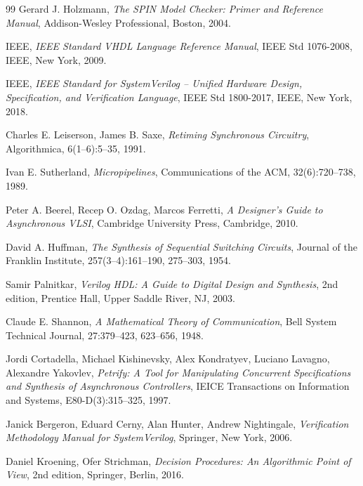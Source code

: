 ﻿\documentclass[a4paper,12pt]{article}
\theoremstyle{definition}
\begin{document}
\begin{thebibliography}{99}
		Gerard J. Holzmann,
		\textit{The SPIN Model Checker: Primer and Reference Manual},
		Addison-Wesley Professional, Boston, 2004.

		IEEE,
		\textit{IEEE Standard VHDL Language Reference Manual},
		IEEE Std 1076-2008, IEEE, New York, 2009.

		IEEE,
		\textit{IEEE Standard for SystemVerilog -- Unified Hardware Design, Specification,
		and Verification Language},
		IEEE Std 1800-2017, IEEE, New York, 2018.

		Charles E. Leiserson, James B. Saxe,
		\textit{Retiming Synchronous Circuitry},
		Algorithmica, 6(1--6):5--35, 1991.

		Ivan E. Sutherland,
		\textit{Micropipelines},
		Communications of the ACM, 32(6):720--738, 1989.

		Peter A. Beerel, Recep O. Ozdag, Marcos Ferretti,
		\textit{A Designer's Guide to Asynchronous VLSI},
		Cambridge University Press, Cambridge, 2010.

		David A. Huffman,
		\textit{The Synthesis of Sequential Switching Circuits},
		Journal of the Franklin Institute, 257(3--4):161--190, 275--303, 1954.

		Samir Palnitkar,
		\textit{Verilog HDL: A Guide to Digital Design and Synthesis},
		2nd edition, Prentice Hall, Upper Saddle River, NJ, 2003.

		Claude E. Shannon,
		\textit{A Mathematical Theory of Communication},
		Bell System Technical Journal, 27:379--423, 623--656, 1948.

		Jordi Cortadella, Michael Kishinevsky, Alex Kondratyev,
		Luciano Lavagno, Alexandre Yakovlev,
		\textit{Petrify: A Tool for Manipulating Concurrent Specifications and
		Synthesis of Asynchronous Controllers},
		IEICE Transactions on Information and Systems,
		E80-D(3):315--325, 1997.

		Janick Bergeron, Eduard Cerny, Alan Hunter, Andrew Nightingale,
		\textit{Verification Methodology Manual for SystemVerilog},
		Springer, New York, 2006.

		Daniel Kroening, Ofer Strichman,
		\textit{Decision Procedures: An Algorithmic Point of View},
		2nd edition, Springer, Berlin, 2016.

	\end{thebibliography}
	
\end{document}
